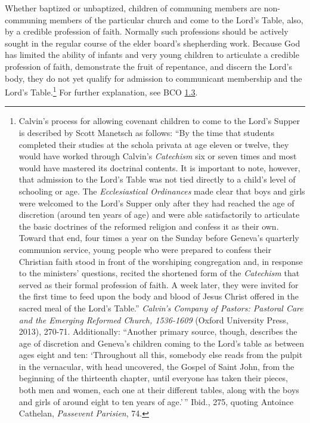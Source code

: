 \documentclass[
]{book}
\begin{document}
\begin{enumerate}
  Whether baptized or unbaptized, children of communing members are non-communing members of the particular church and come to the Lord's Table, also, by a credible profession of faith. Normally such professions should be actively sought in the regular course of the elder board's shepherding work. Because God has limited the ability of infants and very young children to articulate a credible profession of faith, demonstrate the fruit of repentance, and discern the Lord's body, they do not yet qualify for admission to communicant membership and the Lord's Table.\footnote{Calvin's process for allowing covenant children to come to the Lord's Supper is described by Scott Manetsch as follows: ``By the time that students completed their studies at the schola privata at age eleven or twelve, they would have worked through Calvin's \emph{Catechism} six or seven times and most would have mastered its doctrinal contents. It is important to note, however, that admission to the Lord's Table was not tied directly to a child's level of schooling or age. The \emph{Ecclesiastical Ordinances} made clear that boys and girls were welcomed to the Lord's Supper only after they had reached the age of discretion (around ten years of age) and were able satisfactorily to articulate the basic doctrines of the reformed religion and confess it as their own. Toward that end, four times a year on the Sunday before Geneva's quarterly communion service, young people who were prepared to confess their Christian faith stood in front of the worshiping congregation and, in response to the ministers' questions, recited the shortened form of the \emph{Catechism} that served as their formal profession of faith. A week later, they were invited for the first time to feed upon the body and blood of Jesus Christ offered in the sacred meal of the Lord's Table.'' \emph{Calvin's Company of Pastors: Pastoral Care and the Emerging Reformed Church, 1536-1609} (Oxford University Press, 2013), 270-71. Additionally: ``Another primary source, though, describes the age of discretion and Geneva's children coming to the Lord's table as between ages eight and ten: `Throughout all this, somebody else reads from the pulpit in the vernacular, with head uncovered, the Gospel of Saint John, from the beginning of the thirteenth chapter, until everyone has taken their pieces, both men and women, each one at their different tables, along with the boys and girls of around eight to ten years of age.'\,'' Ibid., 275, quoting Antoince Cathelan, \emph{Passevent Parisien}, 74.} For further explanation, see BCO \protect\hyperlink{1.3}{1.3}.
\end{enumerate}
\end{document}
